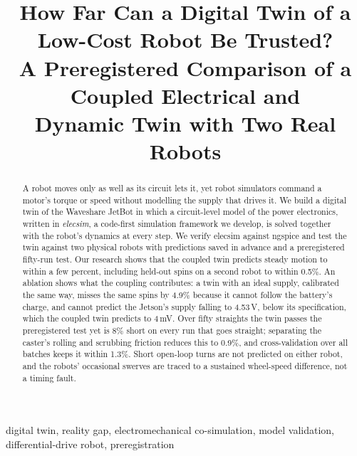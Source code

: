 \documentclass[conference,a4paper]{IEEEtran}
\begin{document}
\title{How Far Can a Digital Twin of a Low-Cost Robot Be Trusted?\\
A Preregistered Comparison of a Coupled Electrical and\\ Dynamic Twin with Two Real Robots}

\author{
}

\maketitle

\begin{abstract}
A robot moves only as well as its circuit lets it, yet robot simulators
command a motor's torque or speed without modelling the supply that drives
it. We build a digital twin of the
Waveshare JetBot in which a circuit-level model of the power electronics,
written in \emph{elecsim}, a code-first simulation framework we develop, is
solved together with the robot's dynamics at every step. We verify elecsim
against ngspice and test the twin against two physical robots with
predictions saved in advance and a preregistered fifty-run test. Our research
shows that the coupled twin predicts steady motion to within a few percent,
including held-out spins on a second robot to within 0.5\%. An ablation shows
what the coupling contributes: a twin with an ideal supply, calibrated the
same way, misses the same spins by 4.9\% because it cannot follow the
battery's charge, and cannot predict the Jetson's supply falling to 4.53\,V,
below its specification, which the coupled twin predicts to 4\,mV. Over fifty
straights the twin passes the preregistered test yet is 8\% short on every
run that goes straight; separating the caster's rolling and scrubbing
friction reduces this to 0.9\%, and cross-validation over all batches keeps
it within 1.3\%. Short open-loop turns are not predicted on either robot, and
the robots' occasional swerves are traced to a sustained wheel-speed
difference, not a timing fault.
\end{abstract}

\begin{IEEEkeywords}
digital twin, reality gap, electromechanical co-simulation, model validation,
differential-drive robot, preregistration
\end{IEEEkeywords}
\end{document}
